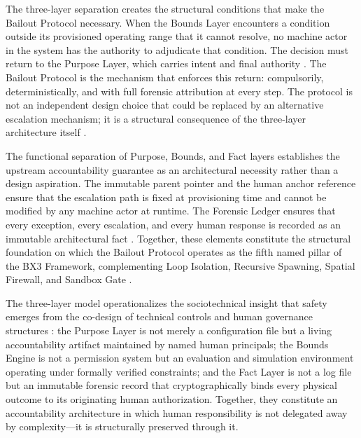 The three-layer separation creates the structural conditions that make the Bailout Protocol necessary. When the Bounds Layer encounters a condition outside its provisioned operating range that it cannot resolve, no machine actor in the system has the authority to adjudicate that condition. The decision must return to the Purpose Layer, which carries intent and final authority \cite{dijkstra1982}. The Bailout Protocol is the mechanism that enforces this return: compulsorily, deterministically, and with full forensic attribution at every step. The protocol is not an independent design choice that could be replaced by an alternative escalation mechanism; it is a structural consequence of the three-layer architecture itself \cite{wiener1948}.

The functional separation of Purpose, Bounds, and Fact layers establishes the upstream accountability guarantee as an architectural necessity rather than a design aspiration. The immutable parent pointer and the human anchor reference ensure that the escalation path is fixed at provisioning time and cannot be modified by any machine actor at runtime. The Forensic Ledger ensures that every exception, every escalation, and every human response is recorded as an immutable architectural fact \cite{tristr81}. Together, these elements constitute the structural foundation on which the Bailout Protocol operates as the fifth named pillar of the BX3 Framework, complementing Loop Isolation, Recursive Spawning, Spatial Firewall, and Sandbox Gate \cite{bansal2019}.

The three-layer model operationalizes the sociotechnical insight that safety emerges from the co-design of technical controls and human governance structures \cite{tristr81}: the Purpose Layer is not merely a configuration file but a living accountability artifact maintained by named human principals; the Bounds Engine is not a permission system but an evaluation and simulation environment operating under formally verified constraints; and the Fact Layer is not a log file but an immutable forensic record that cryptographically binds every physical outcome to its originating human authorization. Together, they constitute an accountability architecture in which human responsibility is not delegated away by complexity—it is structurally preserved through it.
